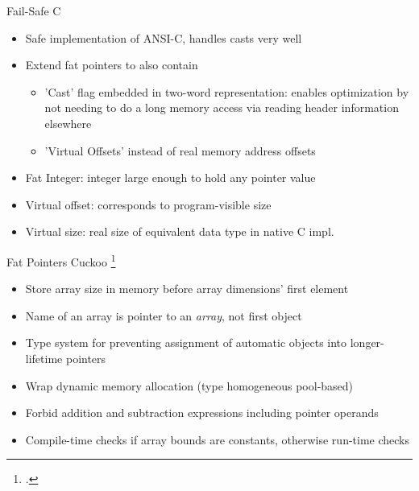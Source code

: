 \begin{frame}{Fail-Safe C}
\begin{itemize}
\item Safe implementation of ANSI-C, handles casts very well
\item Extend fat pointers to also contain
    \begin{itemize}
        \item 'Cast' flag embedded in two-word representation: enables optimization by not needing to do a long memory access via reading header information elsewhere
        \item 'Virtual Offsets' instead of real memory address offsets
    \end{itemize}
\item Fat Integer: integer large enough to hold any pointer value
\item Virtual offset: corresponds to program-visible size
\item Virtual size: real size of equivalent data type in native C impl.
\end{itemize}
\end{frame}

\begin{frame}{Fat Pointers}
Cuckoo \footcite{west_cuckoo:_2005}
      \begin{itemize}
       \item Store array size in memory before array dimensions' first element
       \item Name of an array is pointer to an \emph{array}, not first object
       \item Type system for preventing assignment of automatic objects into longer-lifetime pointers
       \item Wrap dynamic memory allocation (type homogeneous pool-based) %
       \item Forbid addition and subtraction expressions including pointer operands
       \item Compile-time checks if array bounds are constants, otherwise run-time checks
      \end{itemize}
\end{frame}


